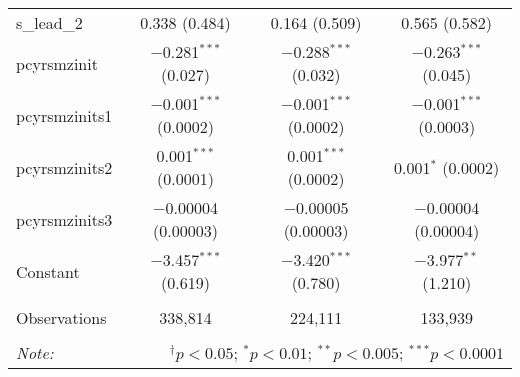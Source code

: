 \begin{table}[!htbp]
\begin{tabular}{@{\extracolsep{5pt}}lccc}
  s\_lead\_2 & 0.338 (0.484) & 0.164 (0.509) & 0.565 (0.582) \\ 
  pcyrsmzinit & $-$0.281$^{***}$ (0.027) & $-$0.288$^{***}$ (0.032) & $-$0.263$^{***}$ (0.045) \\ 
  pcyrsmzinits1 & $-$0.001$^{***}$ (0.0002) & $-$0.001$^{***}$ (0.0002) & $-$0.001$^{***}$ (0.0003) \\ 
  pcyrsmzinits2 & 0.001$^{***}$ (0.0001) & 0.001$^{***}$ (0.0002) & 0.001$^{*}$ (0.0002) \\ 
  pcyrsmzinits3 & $-$0.00004 (0.00003) & $-$0.00005 (0.00003) & $-$0.00004 (0.00004) \\ 
  Constant & $-$3.457$^{***}$ (0.619) & $-$3.420$^{***}$ (0.780) & $-$3.977$^{**}$ (1.210) \\ 
 \hline \\[-1.8ex] 
Observations & 338,814 & 224,111 & 133,939 \\ 
\hline 
\hline \\[-1.8ex] 
\textit{Note:}  & \multicolumn{3}{r}{$^{\dagger} p<0.05$; $^{*} p<0.01$; $^{**} p<0.005$; $^{***} p<0.0001$} \\ 
\end{tabular} 
\end{table} 
